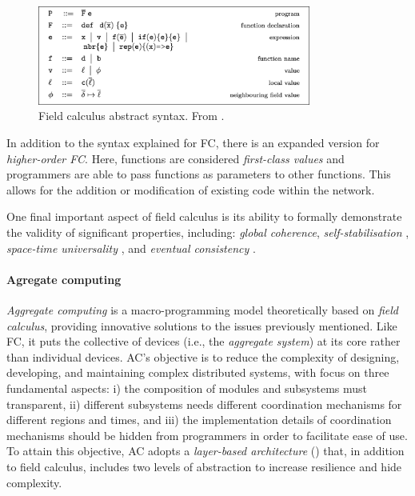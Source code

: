 \documentclass[12pt,a4paper,openright,twoside]{book}
\begin{document}
    \begin{figure}[t]
        \centering
        \includegraphics[width=0.8\textwidth]{figures/FC-abstract-syntax.png}
        \caption{Field calculus abstract syntax. From \cite{fieldcalculus}.}
        \label{fig:fc-syntax}
    \end{figure}

In addition to the syntax explained for FC, there is an expanded version for \emph{higher-order FC}. 
    Here, functions are considered \emph{first-class values} and programmers are able to pass functions as parameters 
    to other functions. This allows for the addition or modification of existing code within the network.

One final important aspect of field calculus is its ability to formally demonstrate the 
    validity of significant properties, including:
    \emph{global coherence}, \emph{self-stabilisation} \cite{viroli2018engineering}, 
    \emph{space-time universality} \cite{audrito2018space}, and \emph{eventual consistency} \cite{beal2017self}.

\paragraph{Agregate computing}
\emph{Aggregate computing} \cite{AC} is a macro-programming model theoretically based on \emph{field calculus}, providing innovative solutions
    to the issues previously mentioned. Like FC, it puts the collective of devices (i.e., the \emph{aggregate system})  at its core 
    rather than individual devices. AC's objective is to reduce the complexity of designing, developing, 
    and maintaining complex distributed systems, with focus on three fundamental aspects:
    i) the composition of modules and subsystems must transparent,
    ii) different subsystems needs different coordination mechanisms for different regions and times, and 
    iii) the implementation details of coordination mechanisms should be hidden from programmers in order to facilitate ease of use.
    To attain this objective, AC adopts a \emph{layer-based architecture} () that, in addition to field calculus, 
    includes two levels of abstraction to increase resilience and hide complexity. 
\end{document}
